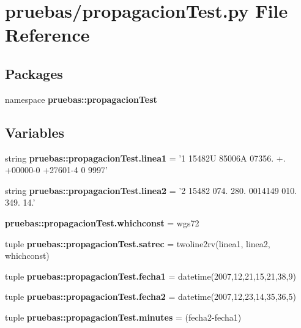 \section{pruebas/propagacion\-Test.py \-File \-Reference}
\label{propagacion_test_8py}
\subsection*{\-Packages}
\begin{DoxyCompactItemize}
\item 
namespace {\bf pruebas\-::propagacion\-Test}
\end{DoxyCompactItemize}
\subsection*{\-Variables}
\begin{DoxyCompactItemize}
\item 
string {\bf pruebas\-::propagacion\-Test.\-linea1} = '1 15482\-U 85006\-A 07356. +. +00000-\/0 +27601-\/4 0 9997'
\item 
string {\bf pruebas\-::propagacion\-Test.\-linea2} = '2 15482 074. 280. 0014149 010. 349. 14.'
\item 
{\bf pruebas\-::propagacion\-Test.\-whichconst} = wgs72
\item 
tuple {\bf pruebas\-::propagacion\-Test.\-satrec} = twoline2rv(linea1, linea2, whichconst)
\item 
tuple {\bf pruebas\-::propagacion\-Test.\-fecha1} = datetime(2007,12,21,15,21,38,9)
\item 
tuple {\bf pruebas\-::propagacion\-Test.\-fecha2} = datetime(2007,12,23,14,35,36,5)
\item 
tuple {\bf pruebas\-::propagacion\-Test.\-minutes} = (fecha2-\/fecha1)
\end{DoxyCompactItemize}
